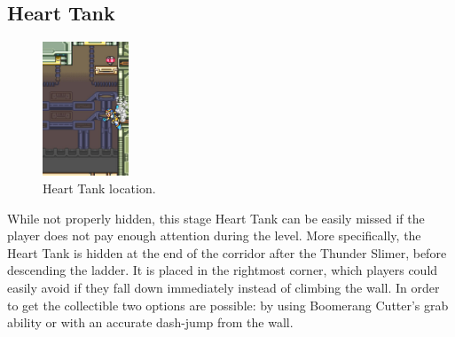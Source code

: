 \subsection{Heart Tank}
\begin{figure}[htp]
	\centering
	\includegraphics[height=4cm]{figures/X1/Spark_mandrill/Mandrill_heart.jpg}
	\caption{Heart Tank location.}
\end{figure}
While not properly hidden, this stage Heart Tank can be easily missed if the player does not pay enough attention during the level. More specifically, the Heart Tank is hidden at the end of the corridor after the Thunder Slimer, before descending the ladder. It is placed in the rightmost corner, which players could easily avoid if they fall down immediately instead of climbing the wall. In order to get the collectible two options are possible: by using Boomerang Cutter's grab ability or with an accurate dash-jump from the wall.

